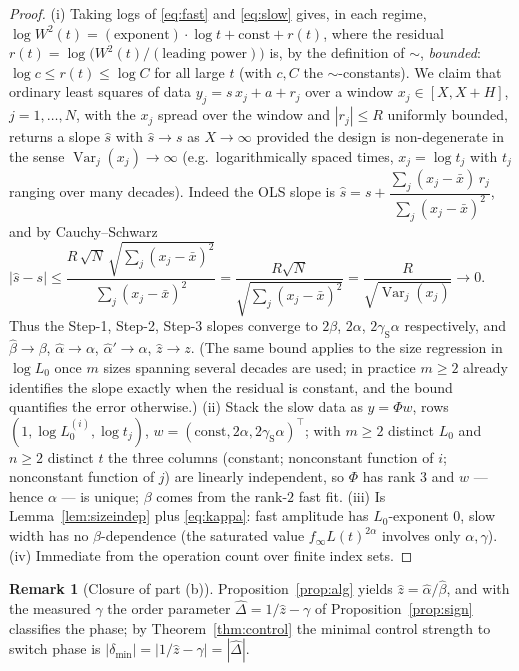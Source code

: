 \documentclass{amsart}
\theoremstyle{definition}
\newtheorem{remark}{Remark}
\newcommand{\asymp}{\sim}
\begin{document}
\begin{proof}
(i) Taking logs of \eqref{eq:fast} and \eqref{eq:slow} gives, in each regime,
$\log W^2(t)=(\text{exponent})\cdot\log t+\text{const}+r(t)$, where the residual
$r(t)=\log\bigl(W^2(t)/(\text{leading power})\bigr)$ is, by the definition of
$\asymp$, \emph{bounded}: $\log c\le r(t)\le\log C$ for all large $t$ (with
$c,C$ the $\asymp$-constants). We claim that ordinary least squares of data
$y_j=s\,x_j+a+r_j$ over a window $x_j\in[X,X+H]$, $j=1,\dots,N$, with the $x_j$
spread over the window and $|r_j|\le R$ uniformly bounded, returns a slope
$\hat s$ with $\hat s\to s$ as $X\to\infty$ provided the design is non-degenerate
in the sense $\operatorname{Var}_j(x_j)\to\infty$ (e.g.\ logarithmically spaced
times, $x_j=\log t_j$ with $t_j$ ranging over many decades). Indeed the OLS slope
is $\hat s=s+\dfrac{\sum_j(x_j-\bar x)\,r_j}{\sum_j(x_j-\bar x)^2}$, and by
Cauchy--Schwarz $\bigl|\hat s-s\bigr|\le
\dfrac{R\,\sqrt{N}\,\sqrt{\sum_j(x_j-\bar x)^2}}{\sum_j(x_j-\bar x)^2}
=\dfrac{R\sqrt N}{\sqrt{\sum_j(x_j-\bar x)^2}}
=\dfrac{R}{\sqrt{\operatorname{Var}_j(x_j)}}\to0.$
Thus the Step-1, Step-2, Step-3 slopes converge to $2\beta$, $2\alpha$,
$2\gamma_{\mathrm S}\alpha$ respectively, and $\hat\beta\to\beta$,
$\hat\alpha\to\alpha$, $\hat\alpha'\to\alpha$, $\hat z\to z$. (The same
bound applies to the size regression in $\log L_0$ once $m$ sizes spanning several
decades are used; in practice $m\ge2$ already identifies the slope exactly when the
residual is constant, and the bound quantifies the error otherwise.) (ii) Stack the slow data as
$y=\Phi w$, rows $(1,\log L_0^{(i)},\log t_j)$, $w=(\text{const},2\alpha,
2\gamma_{\mathrm S}\alpha)^\top$; with $m\ge2$ distinct $L_0$ and $n\ge2$ distinct
$t$ the three columns (constant; nonconstant function of $i$; nonconstant function
of $j$) are linearly independent, so $\Phi$ has rank $3$ and $w$ — hence $\alpha$ —
is unique; $\beta$ comes from the rank-$2$ fast fit. (iii) Is
Lemma~\ref{lem:sizeindep} plus \eqref{eq:kappa}: fast amplitude has $L_0$-exponent
$0$, slow width has no $\beta$-dependence (the saturated value $f_\infty L(t)^{2\alpha}$
involves only $\alpha,\gamma$). (iv) Immediate from the operation count over finite
index sets.
\end{proof}

\begin{remark}[Closure of part (b)]
Proposition~\ref{prop:alg} yields $\hat z=\hat\alpha/\hat\beta$, and with the
measured $\gamma$ the order parameter $\widehat\Delta=1/\hat z-\gamma$ of
Proposition~\ref{prop:sign} classifies the phase; by Theorem~\ref{thm:control} the
minimal control strength to switch phase is
$|\delta_{\min}|=|1/\hat z-\gamma|=|\widehat\Delta|$.
\end{remark}
\end{document}
